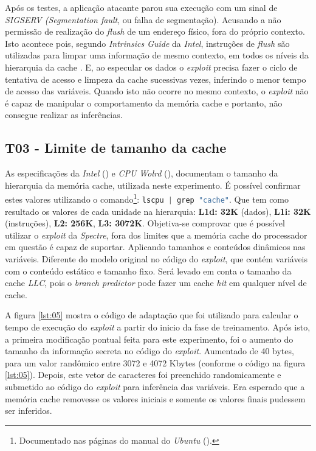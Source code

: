 \documentclass[conference]{IEEEtran}
\begin{document}
Após os testes, a aplicação atacante parou sua execução com um sinal de \emph{SIGSERV (Segmentation fault}, ou falha de segmentação). Acusando a não permissão de realização do \emph{flush} de um endereço físico, fora do próprio contexto. Isto acontece pois, segundo \emph{Intrinsics Guide} da \emph{Intel}, instruções de \emph{flush} são utilizadas para limpar uma informação de mesmo contexto, em todos os níveis da hierarquia da cache \cite{Intel2018Intrinsics}. E, ao especular os dados o \emph{exploit} precisa fazer o ciclo de tentativa de acesso e limpeza da cache sucessivas vezes, inferindo o menor tempo de acesso das variáveis. Quando isto não ocorre no mesmo contexto, o \emph{exploit} não é capaz de manipular o comportamento da memória cache e portanto, não consegue realizar as inferências.

\begin{comment}
explicar mais sobre o que é "contexto" nesse sentindo
\end{comment}

\subsection{T03 - Limite de tamanho da cache}
As especificações da \emph{Intel} (\citeyear{Intel2019Corei3}) e \emph{CPU Wolrd} (\citeyear{CPU2016Corei3}), documentam o tamanho da hierarquia da memória cache, utilizada neste experimento. É possível confirmar estes valores utilizando o comando\footnote{Documentado nas páginas do manual do \emph{Ubuntu} (\citeyear{Ubuntu2019Lscpu}).}: \lstinline[language=C, style=c]{lscpu | grep "cache"}. Que tem como resultado os valores de cada unidade na hierarquia: \textbf{L1d: 32K} (dados), \textbf{L1i: 32K} (instruções), \textbf{L2: 256K}, \textbf{L3: 3072K}. Objetiva-se comprovar que é possível utilizar o \emph{exploit} da \emph{Spectre}, fora dos limites que a memória cache do processador em questão é capaz de suportar. Aplicando tamanhos e conteúdos dinâmicos nas variáveis. Diferente do modelo original no código do \emph{exploit}, que contém variáveis com o conteúdo estático e tamanho fixo. Será levado em conta o tamanho da cache \emph{LLC}, pois o \emph{branch predictor} pode fazer um cache \emph{hit} em qualquer nível de cache.

A figura \ref{lst:05} mostra o código de adaptação que foi utilizado para calcular o tempo de execução do \emph{exploit} a partir do inicio da fase de treinamento. Após isto, a primeira modificação pontual feita para este experimento, foi o aumento do tamanho da informação secreta no código do \emph{exploit}. Aumentado de 40 bytes, para um valor randômico entre 3072 e 4072 Kbytes (conforme o código na figura \ref{lst:05}). Depois, este vetor de caracteres foi preenchido randomicamente e submetido ao código do \emph{exploit} para inferência das variáveis. Era esperado que a memória cache removesse os valores iniciais e somente os valores finais pudessem ser inferidos.
\end{document}
